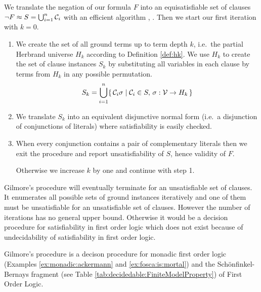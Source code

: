 \begin{procedure}\label{proc:gilmore's:prover}
	We translate the negation of our formula $F$ into an equisatisfiable set of clauses 
	$\lnot F \approx S = \bigcup_{i=1}^{n} {\mathcal C}_i$ with an efficient algorithm \cite{tseitin70}, \cite{PLAISTED1986293}.
	Then we start our first iteration with $k=0$.
	\begin{enumerate}
		
		\item We create the set of all ground terms up to term depth $k$, 
		i.e.~the partial Herbrand universe $H_k$ according to Definition \ref{def:hk}. 
		We use $H_k$ to create the set of clause instances $S_k$ 
		by substituting all variables 
		in each clause by terms from $H_k$ in any possible permutation.
		\[ S_k = \bigcup_{i=1}^{n} 
		\{\,
			{\mathcal C}_i\sigma \mid {\mathcal C}_i \in S,\,\sigma: {\mathcal V}\to H_k
		\,\}
		\]
		
		\item We translate $S_k$ into an equivalent disjunctive normal form 
		(i.e.~a disjunction of conjunctions of literals)
		where satisfiability is easily checked.
		
		

		\item When every conjunction contains a pair of complementary literals 
		then we exit the procedure and report unsatisfiability of $S$, 
		hence validity of $F$.

Otherwise we increase $k$ by one and continue with step 1.
		
		
	\end{enumerate}
	
\end{procedure}

Gilmore's procedure will eventually terminate for an unsatisfiable set of clauses.
It enumerates all possible sets of ground instances iteratively
and one of them must be unsatisfiable for an unsatisfiable set of clauses. 
However the number of iterations has no general upper bound. 
Otherwise it would be a decision procedure for satisfiability in first order logic
which does not exist because of undecidability of satisfiability in first order logic.

\begin{lemma}
	Gilmore's procedure is a decison procedure for monadic first order logic 
	(Examples \ref{ex:monadic:ackermann} and \ref{ex:fosca:is:mortal})
	and the Schönfinkel-Bernays fragment (see Table \ref{tab:decidedable:FiniteModelProperty}) 
	of First Order Logic. 
\end{lemma}

